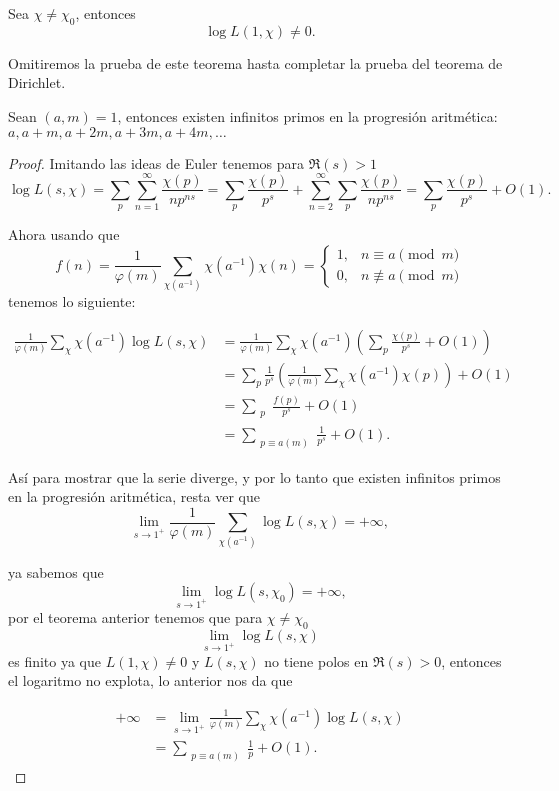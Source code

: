 \begin{theorem}[Dirichlet]
Sea $\chi \neq \chi_0$, entonces \[
\log L(1, \chi) \neq 0.
\]
\end{theorem}

Omitiremos la prueba de este teorema hasta completar la prueba del teorema de Dirichlet.


\begin{theorem}[Dirichlet 1837]
Sean $(a, m) = 1$, entonces existen infinitos primos en la progresión aritmética: $a, a + m, a + 2m, a + 3m, a + 4m, \dots$

\end{theorem}

\begin{proof}
Imitando las ideas de Euler tenemos para $\Re(s) > 1$
\[
\log L(s, \chi) = \sum_p \sum_{n=1}^{\infty} \frac{\chi(p)}{np^{ns}} = \sum_p \frac{\chi(p)}{p^s} + \sum_{n=2}^{\infty} \sum_p \frac{\chi(p)}{np^{ns}} = \sum_p \frac{\chi(p)}{p^s} + O(1).
\]

Ahora usando que
\[f(n)=
\frac{1}{\varphi(m)} \sum_{\chi (a^{-1})} \chi(a^{-1}) \chi(n) = 
\begin{cases}
1, & n \equiv a \pmod{m} \\
0, & n \not\equiv a \pmod{m}
\end{cases}
\]
tenemos lo siguiente:

\begin{align*}
    \frac{1}{\varphi(m)} \sum_{\chi} \chi(a^{-1}) \log L(s, \chi)&= \frac{1}{\varphi(m)} \sum_{\chi} \chi(a^{-1})\left(\sum_p \frac{\chi(p)}{p^s} + O(1)\right)\\
    &= \sum_p \frac{1}{p^s} \left( \frac{1}{\varphi(m)} \sum_{\chi} \chi(a^{-1}) \chi(p) \right) + O(1)\\
&= \sum_{\substack{p}} \frac{f(p)}{p^s} + O(1)\\
&=\sum_{\substack{p \equiv a(m)}} \frac{1}{p^s} + O(1)
.\end{align*}

Así para mostrar que la serie diverge, y por lo tanto que existen infinitos primos en la progresión aritmética, resta ver que
\[
\lim_{s \to 1^+} \frac{1}{\varphi(m)} \sum_{\chi (a^{-1})} \log L(s, \chi) = +\infty,
\]

ya sabemos que
\[
\lim_{s \to 1^+} \log L(s, \chi_0) = +\infty,
\]
por el teorema anterior tenemos que para $\chi \neq \chi_0$
\[
\lim_{s \to 1^+} \log L(s, \chi)
\]
es finito ya que $L(1,\chi)\neq 0$ y $L(s,\chi)$ no tiene polos en $\Re(s)>0$, entonces el logaritmo no explota, lo anterior nos da que 

\begin{align*}
     +\infty&=\lim_{s \to 1^{+}} \frac{1}{\varphi(m)} \sum_{\chi} \chi(a^{-1}) \log L(s, \chi)\\
     &=\sum_{\substack{p \equiv a(m)}} \frac{1}{p} + O(1)
.\end{align*}
\end{proof}

